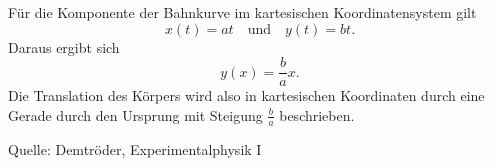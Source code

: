 \begin{MContent}
\begin{MExercise}
\begin{MSolution} F\"ur die Komponente der Bahnkurve im kartesischen Koordinatensystem gilt 
\begin{equation*}
x(t)=a t \quad\text{und}\quad y(t)=b t.
\end{equation*} Daraus ergibt sich
\begin{equation*}
y(x)=\frac{b}{a}x.
\end{equation*}
Die Translation des K\"orpers wird also in kartesischen Koordinaten durch eine Gerade durch den Ursprung mit Steigung $\frac{b}{a}$ beschrieben.


\end{MSolution}


Quelle: Demtr\"oder, Experimentalphysik I
\end{MExercise}

\end{MContent}

